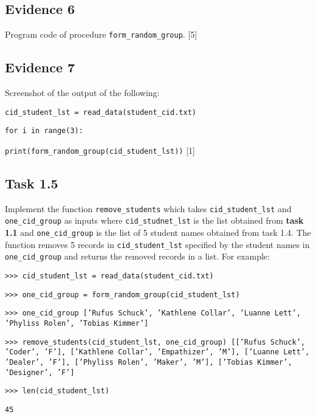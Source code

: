 \subsection*{Evidence 6 }

Program code of procedure \texttt{form\_random\_group}.\hfill{} {[}5{]}

\subsection*{Evidence 7 }

Screenshot of the output of the following: 

\noindent %
\noindent\begin{minipage}[t]{1\columnwidth}%
\texttt{cid\_student\_lst = read\_data(\textquotedbl student\_cid.txt\textquotedbl ) }

\texttt{for i in range(3): }

\texttt{\qquad{}print(form\_random\_group(cid\_student\_lst))} \hfill{}{[}1{]}%
\end{minipage}

\subsection*{Task 1.5 }

Implement the function \texttt{remove\_students} which takes \texttt{cid\_student\_lst}
and \texttt{one\_cid\_group} as inputs where \texttt{cid\_studnet\_lst}
is the list obtained from \textbf{task 1.1} and \texttt{one\_cid\_group}
is the list of 5 student names obtained from task 1.4. The function
removes 5 records in \texttt{cid\_student\_lst} specified by the student
names in \texttt{one\_cid\_group} and returns the removed records
in a list. For example: 

\noindent %
\noindent\begin{minipage}[t]{1\columnwidth}%
\texttt{>\textcompwordmark >\textcompwordmark > cid\_student\_lst
= read\_data(\textquotedbl student\_cid.txt\textquotedbl )}

\texttt{>\textcompwordmark >\textcompwordmark > one\_cid\_group
= form\_random\_group(cid\_student\_lst) }

\texttt{>\textcompwordmark >\textcompwordmark > one\_cid\_group
{[}'Rufus Schuck', 'Kathlene Collar', 'Luanne Lett', 'Phyliss Rolen',
'Tobias Kimmer'{]} }

\texttt{>\textcompwordmark >\textcompwordmark > remove\_students(cid\_student\_lst,
one\_cid\_group) {[}{[}'Rufus Schuck', 'Coder', 'F'{]}, {[}'Kathlene
Collar', 'Empathizer', 'M'{]}, {[}'Luanne Lett', 'Dealer', 'F'{]},
{[}'Phyliss Rolen', 'Maker', 'M'{]}, {[}'Tobias Kimmer', 'Designer',
'F'{]}}

\texttt{>\textcompwordmark >\textcompwordmark > len(cid\_student\_lst) }

\texttt{45 }%
\end{minipage}

